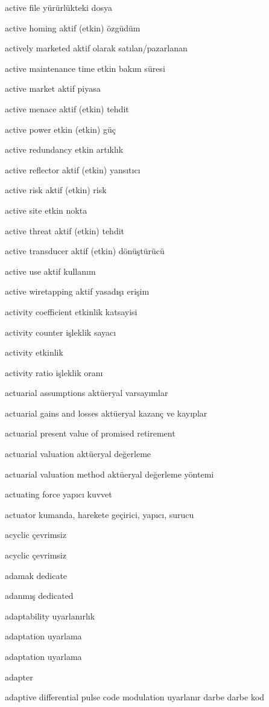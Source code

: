 \documentclass[12pt,fleqn]{article}\usepackage{../../common}
\begin{document}
active file yürürlükteki dosya

active homing aktif (etkin) özgüdüm

actively marketed aktif olarak satılan/pazarlanan

active maintenance time etkin bakım süresi

active market aktif piyasa

active menace aktif (etkin) tehdit

active power etkin (etkin) güç

active redundancy etkin artıklık

active reflector aktif (etkin) yansıtıcı

active risk aktif (etkin) risk

active site etkin nokta

active threat aktif (etkin) tehdit

active transducer aktif (etkin) dönüştürücü

active use aktif kullanım

active wiretapping aktif yasadışı erişim

activity coefficient etkinlik katsayisi

activity counter işleklik sayacı

activity etkinlik

activity ratio işleklik oranı

actuarial assumptions aktüeryal varsayımlar

actuarial gains and losses aktüeryal kazanç ve kayıplar

actuarial present value of promised retirement

actuarial valuation aktüeryal değerleme

actuarial valuation method aktüeryal değerleme yöntemi

actuating force yapıcı kuvvet

actuator kumanda, harekete geçirici, yapıcı, surucu

acyclic çevrimsiz

acyclic çevrimsiz

adamak dedicate

adanmış dedicated

adaptability uyarlanırlık

adaptation uyarlama

adaptation uyarlama

adapter

adaptive differential pulse code modulation uyarlanır darbe darbe kod
\end{document}
